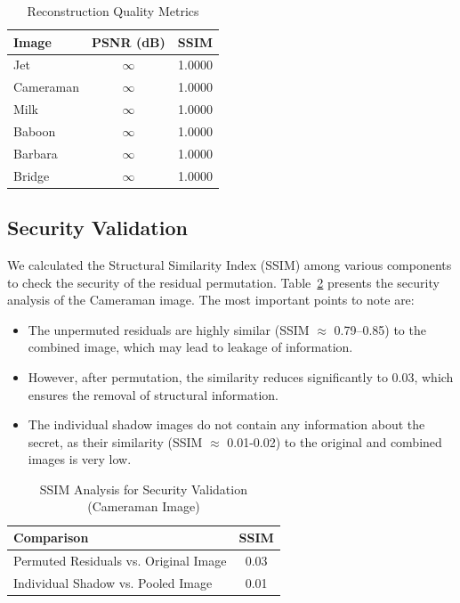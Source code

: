 \begin{table}[h!]
\centering
\caption{Reconstruction Quality Metrics}
\label{tab:quality_metrics}
\begin{tabular}{|l|c|c|}
\hline
\textbf{Image} & \textbf{PSNR (dB)} & \textbf{SSIM} \\ \hline
Jet & $\infty$ & 1.0000 \\ \hline
Cameraman & $\infty$ & 1.0000 \\ \hline
Milk & $\infty$ & 1.0000 \\ \hline
Baboon & $\infty$ & 1.0000 \\ \hline
Barbara & $\infty$ & 1.0000 \\ \hline
Bridge & $\infty$ & 1.0000 \\ \hline
\end{tabular}
\end{table}

\subsection{Security Validation}

We calculated the Structural Similarity Index (SSIM) among various components to check the security of the residual permutation. Table~\ref{tab:security_validation} presents the security analysis of the Cameraman image. The most important points to note are:

\begin{itemize}
\item The unpermuted residuals are highly similar (SSIM $\approx$ 0.79--0.85) to the combined image, which may lead to leakage of information.

\item However, after permutation, the similarity reduces significantly to 0.03, which ensures the removal of structural information.

\item The individual shadow images do not contain any information about the secret, as their similarity (SSIM $\approx$ 0.01-0.02) to the original and combined images is very low.
\end{itemize}

\begin{table}[h!]
\centering
\caption{SSIM Analysis for Security Validation (Cameraman Image)}
\label{tab:security_validation}
\begin{tabular}{|l|c|}
\hline
\textbf{Comparison} & \textbf{SSIM} \\ \hline
Permuted Residuals vs. Original Image & 0.03 \\ \hline
Individual Shadow vs. Pooled Image & 0.01 \\ \hline
\end{tabular}
\end{table}


